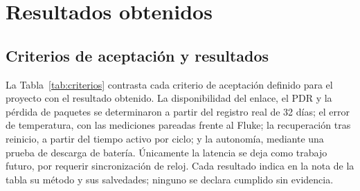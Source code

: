 \documentclass[conference]{IEEEtran}
\begin{document}
\section{Resultados obtenidos}

\subsection{Criterios de aceptación y resultados}

La Tabla~\ref{tab:criterios} contrasta cada criterio de aceptación definido para el proyecto con el resultado obtenido. La disponibilidad del enlace, el PDR y la pérdida de paquetes se determinaron a partir del registro real de 32 días; el error de temperatura, con las mediciones pareadas frente al Fluke; la recuperación tras reinicio, a partir del tiempo activo por ciclo; y la autonomía, mediante una prueba de descarga de batería. Únicamente la latencia se deja como trabajo futuro, por requerir sincronización de reloj. Cada resultado indica en la nota de la tabla su método y sus salvedades; ninguno se declara cumplido sin evidencia.
\end{document}

